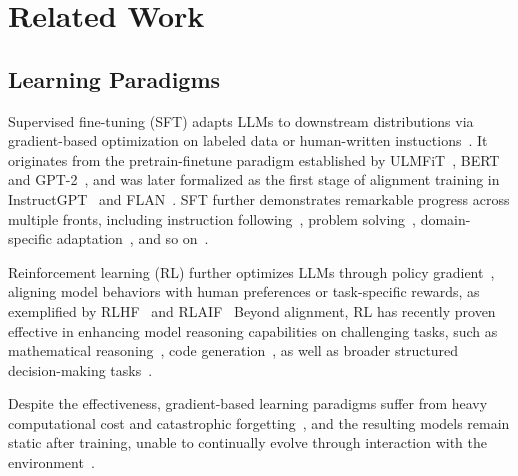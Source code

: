 \section{Related Work}
\subsection{Learning Paradigms}
Supervised fine-tuning (SFT) adapts LLMs to downstream distributions via gradient-based optimization on labeled data or human-written instuctions~\cite{howard2018universal,devlin2019bert,radford2019language,raffel2020exploring}.
It originates from the pretrain-finetune paradigm established by ULMFiT~\cite{howard2018universal}, BERT~\cite{devlin2019bert} and GPT-2~\cite{radford2019language}, and was later formalized as the first stage of alignment training in InstructGPT~\cite{ouyang2022training} and FLAN~\cite{wei2021finetuned}.
SFT further demonstrates remarkable progress across multiple fronts, including instruction following~\cite{ouyang2022training,sanh2021multitask,wei2021finetuned}, problem solving~\cite{toshniwal2024openmathinstruct,ahn2024large,luo2023wizardmath}, domain-specific adaptation~\cite{luo2022biogpt,zhang2024chemllm,liu2023fingpt,zhou2024lawgpt}, and so on~\cite{chen2021evaluating,roziere2023code,li2023starcoder,fried2022incoder}.

Reinforcement learning (RL) further optimizes LLMs through policy gradient~\cite{schulman2017proximal,sutton1999policy,schulman2015trust}, aligning model behaviors with human preferences or task-specific rewards, as exemplified by RLHF~\cite{christiano2017deep,ziegler2019fine,stiennon2020learning,ouyang2022training,rafailov2023direct} and RLAIF~\cite{bai2022training,lee2023rlaif}
Beyond alignment, RL has recently proven effective in enhancing model reasoning capabilities on challenging tasks, such as mathematical reasoning~\cite{shao2024deepseekmath,guo2025deepseek,yu2025dapo,yue2025vapo}, code generation~\cite{le2022coderl,shojaee2023execution,wang2024rlcoder}, as well as broader structured decision-making tasks~\cite{cui2025entropy,hu2025open,zheng2025group,zhang2025survey}.

Despite the effectiveness, gradient-based learning paradigms suffer from heavy computational cost and catastrophic forgetting~\cite{goodfellow2013empirical,hadi2023large}, and the resulting models remain static after training, unable to continually evolve through interaction with the environment~\cite{abbas2023loss}.

